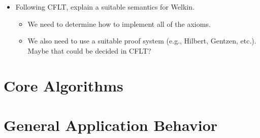 \begin{itemize}
\begin{itemize}
          \begin{itemize}
            \item For efficiency, the standard should use a minimal character set, such as ASCII. However, it would always be possible to \textit{translate} Welkin files by creating foci over them (generally, in the form of new Welkin files). The standard will have a corresponding file for \textit{every} human language possible. (And emojis can be handeled in a similar way; that will be supported but is still TBD). With that said, the standard may use a more efficient encoding overtime, so it may be imposed on \textit{standard implementations}; that is yet to be decided.
            \item Welkin essentially needs the key elements from set theory: conjunction, disjunction, negation, implication, etc. We can use corresponding symbols for these: $&&, ||, \neg, \rightarrow$. In \textit{customizable files}, these symbols can be overloaded and added upon.
          \end{itemize}
  \end{itemize}
  \item Following CFLT, explain a suitable semantics for Welkin.
        \begin{itemize}
          \item We need to determine how to implement all of the axioms.
          \item We also need to use a suitable proof system (e.g., Hilbert, Gentzen, etc.). Maybe that could be decided in CFLT?
        \end{itemize}
\end{itemize}

\section{Core Algorithms}

\section{General Application Behavior}

\label{ch:spec}
